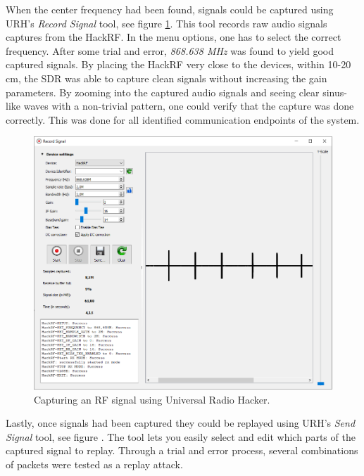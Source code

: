 When the center frequency had been found, signals could be captured using URH's \textit{Record Signal} tool, see figure \ref{fig:rf-signal-capture}. This tool records raw audio signals captures from the HackRF. In the menu options, one has to select the correct frequency. After some trial and error, \textit{868.638 MHz} was found to yield good captured signals. By placing the HackRF very close to the devices, within 10-20 cm, the SDR was able to capture clean signals without increasing the gain parameters. By zooming into the captured audio signals and seeing clear sinus-like waves with a non-trivial pattern, one could verify that the capture was done correctly. This was done for all identified communication endpoints of the system.
\begin{figure}[!ht]
    \centering
    \includegraphics[width=\textwidth]{images/6-pentesting/signal-capture.png}
    \caption{Capturing an RF signal using Universal Radio Hacker.}
    \label{fig:rf-signal-capture}
\end{figure}

Lastly, once signals had been captured they could be replayed using URH's \textit{Send Signal} tool, see figure \todo. The tool lets you easily select and edit which parts of the captured signal to replay. Through a trial and error process, several combinations of packets were tested as a replay attack.

